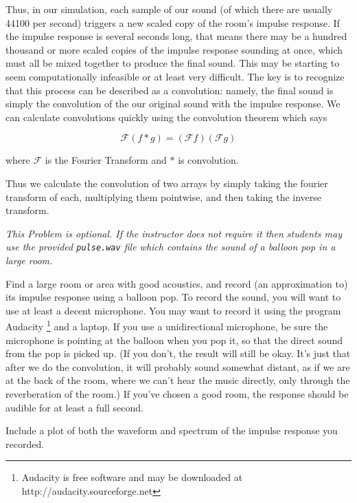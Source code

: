 Thus, in our simulation, each sample of our sound (of which there are usually 44100 per second) triggers a new scaled copy of the room's impulse response. If the impulse response is several seconds long, that means there may be a hundred thousand or more scaled copies of the impulse response sounding at once, which must all be mixed together to produce the final sound. This may be starting to seem computationally infeasible or at least very difficult. The key is to recognize that this process can be described as a convolution: namely, the final sound is simply the convolution of the our original sound with the impulse response. We can calculate convolutions quickly using the convolution theorem which says

\[\mathcal{F}(f \ast g) = (\mathcal{F} f) (\mathcal{F} g)\]

where $\mathcal{F}$ is the Fourier Transform and $\ast$ is convolution.

Thus we calculate the convolution of two arrays by simply taking the fourier transform of each, multiplying them pointwise, and then taking the inverse transform.

\begin{problem}
\emph{This Problem is optional.  If the instructor does not require it then students may use the provided \texttt{pulse.wav} file which contains the sound of a balloon pop in a large room.}

Find a large room or area with good acoustics, and record (an approximation to) its impulse response using a balloon pop. To record the sound, you will want to use at least a decent microphone. You may want to record it using the program Audacity \footnote{Audacity is free software and may be downloaded at http://audacity.sourceforge.net} and a laptop. If you use a unidirectional microphone, be sure the microphone is pointing at the balloon when you pop it, so that the direct sound from the pop is picked up. (If you don't, the result will still be okay. It's just that after we do the convolution, it will probably sound somewhat distant, as if we are at the back of the room, where we can't hear the music directly, only through the reverberation of the room.)
If you've chosen a good room, the response should be audible for at least a full second.

Include a plot of both the waveform and spectrum of the impulse response you recorded.
\end{problem}


